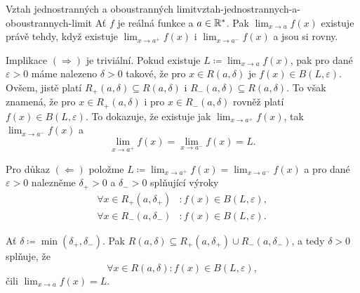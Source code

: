 \begin{proposition}{Vztah jednostranných a oboustranných
 limit}{vztah-jednostrannych-a-oboustrannych-limit}
 Ať $f$ je reálná funkce a $a \in \mathbb{R}^{*}$. Pak $\lim_{x \to a} f(x)$ existuje
 právě tehdy, když existuje $\lim_{x \to a^{+}} f(x)$ i $\lim_{x \to a^{-}}
 f(x)$ a jsou si rovny.
\end{proposition}

\begin{propproof}
 Implikace $( \Rightarrow )$ je triviální. Pokud existuje $L \coloneqq \lim_{x
 \to a} f(x)$, pak pro dané $\varepsilon>0$ máme nalezeno $\delta>0$ takové, že
 pro $x \in R(a,\delta)$ je $f(x) \in B(L,\varepsilon)$. Ovšem, jistě platí
 $R_+(a,\delta) \subseteq R(a,\delta)$ i $R_-(a,\delta) \subseteq R(a,\delta)$.
 To však znamená, že pro $x \in R_+(a,\delta)$ i pro $x \in R_-(a,\delta)$
 rovněž platí $f(x) \in B(L,\varepsilon)$. To dokazuje, že existuje jak $\lim_{x
 \to a^{+}} f(x)$, tak $\lim_{x \to a^{-}} f(x)$ a
 \[
  \lim_{x \to a^{+}} f(x) = \lim_{x \to a^{-}} f(x) = L.
 \]
 
 Pro důkaz $( \Leftarrow )$ položme $L \coloneqq \lim_{x \to a^{+}} f(x) =
 \lim_{x \to a^{-}} f(x)$ a pro dané $\varepsilon>0$ nalezněme $\delta_+>0$ a
 $\delta_- >0$ splňující výroky
 \begin{align*}
  \forall x \in R_+(a,\delta_+) &: f(x) \in B(L,\varepsilon),\\
  \forall x \in R_-(a,\delta_-) &: f(x) \in B(L,\varepsilon).
 \end{align*}

 Ať $\delta \coloneqq \min(\delta_+,\delta_-)$. Pak $R(a,\delta) \subseteq
 R_+(a,\delta_+) \cup R_-(a,\delta_-)$, a tedy $\delta>0$ splňuje, že
 \[
  \forall x \in R(a,\delta):f(x) \in B(L,\varepsilon),
 \]
 čili $\lim_{x \to a} f(x) = L$.
\end{propproof}

